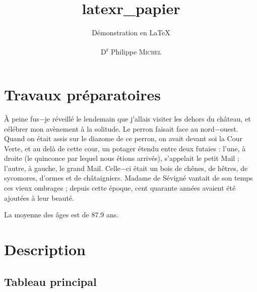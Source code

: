 \documentclass[
  a4paper,
  fontsize=10pt]{scrartcl}
\title{latexr\_papier}
\subtitle{Démonstration en \LaTeX}
\author{D\textsuperscript{r} Philippe \textsc{Michel}}
\date{}
\renewcommand*\contentsname{Table des matières}
\newcommand\contentsname{Table des matières}
\begin{document}
\maketitle
\ifdefined\Shaded\renewenvironment{Shaded}{\begin{tcolorbox}[boxrule=0pt, breakable, sharp corners, interior hidden, borderline west={3pt}{0pt}{shadecolor}, frame hidden, enhanced]}{\end{tcolorbox}}\fi

\renewcommand*\contentsname{Table des matières}
{
\hypersetup{linkcolor=}
\setcounter{tocdepth}{3}
\tableofcontents
}
\listoffigures
\listoftables
\hypertarget{travaux-pruxe9paratoires}{%
\section{Travaux préparatoires}\label{travaux-pruxe9paratoires}}

À peine fus−je réveillé le lendemain que j'allais visiter les dehors du
château, et célébrer mon avènement à la solitude. Le perron faisait face
au nord−ouest. Quand on était assis sur le diazome de ce perron, on
avait devant soi la Cour Verte, et au delà de cette cour, un potager
étendu entre deux futaies : l'une, à droite (le quinconce par lequel
nous étions arrivés), s'appelait le petit Mail ; l'autre, à gauche, le
grand Mail. Celle−ci était un bois de chênes, de hêtres, de sycomores,
d'ormes et de châtaigniers. Madame de Sévigné vantait de son temps ces
vieux ombrages ; depuis cette époque, cent quarante années avaient été
ajoutées à leur beauté.

La moyenne des âges est de 87.9 ans.

\hypertarget{description}{%
\section{Description}\label{description}}

\hypertarget{tableau-principal}{%
\subsection{Tableau principal}\label{tableau-principal}}
\end{document}

